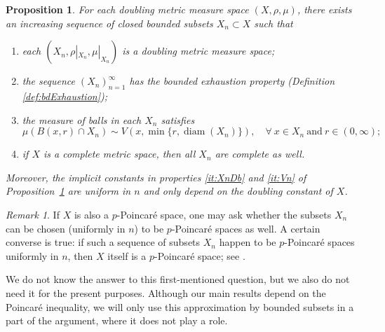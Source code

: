 \documentclass[11pt]{amsart}
\newtheorem{proposition}[theorem]{Proposition}
\theoremstyle{definition}
\theoremstyle{remark}
\newtheorem{remark}[theorem]{Remark}
\numberwithin{equation}{section}
\begin{document}
\begin{proposition}\label{prop:bdSubsets}
For each doubling metric measure space $(X,\rho,\mu)$, there exists an increasing sequence
of closed bounded subsets $X_n\subset X$ such that
\begin{enumerate}[\rm(i)]
  \item\label{it:XnDb} each $(X_n,\rho|_{X_n},\mu|_{X_n})$ is a doubling metric measure
  space;
  \item\label{it:bdExhaustion} the sequence $(X_n)_{n=1}^\infty$ has the bounded exhaustion
  property (Definition \ref{def:bdExhaustion});
  \item\label{it:Vn} the measure of balls in each $X_n$ satisfies
\begin{equation}\label{eq:bdSubsets}
  \mu(B(x,r)\cap X_n)\sim V(x,\min\{r,\operatorname{diam}(X_n)\}),\quad \forall\ x\in X_n
  \ \text{and}\ r\in(0,\infty);
\end{equation}
\item if $X$ is a complete metric space, then all $X_n$ are complete as well.
\end{enumerate}
Moreover, the implicit constants in properties \eqref{it:XnDb} and \eqref{it:Vn}
of Proposition~\ref{prop:bdSubsets} are uniform in $n$ and only depend on the doubling
constant of $X$.
\end{proposition}

\begin{remark}
If $X$ is also a $p$-Poincar\'e space, one may ask whether the subsets $X_n$ can be chosen
(uniformly in $n$) to be $p$-Poincar\'e spaces as well. A certain converse is true: if such
a sequence of subsets $X_n$ happen to be $p$-Poincar\'e spaces uniformly in $n$, then $X$
itself is a $p$-Poincar\'e space; see \cite[Theorem 3]{K:03}.

We do not know the answer to this first-mentioned question, but we also do not need it for
the present purposes. Although our main results depend on the Poincar\'e inequality, we will
only use this approximation by bounded subsets in a part of the argument, where it does not
play a role.
\end{remark}
\end{document}
